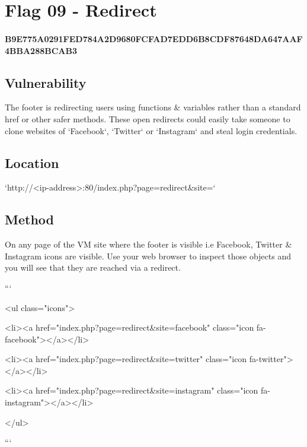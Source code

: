 \section{Flag 09 - Redirect}

\paragraph{B9E775A0291FED784A2D9680FCFAD7EDD6B8CDF87648DA647AAF4BBA288BCAB3}

\subsection{Vulnerability}

The footer is redirecting users using functions \& variables rather than a standard href or other safer methods. These open redirects could easily take someone to clone websites of `Facebook`, `Twitter` or `Instagram` and steal login credentials.

\subsection{Location}

`http://<ip-address>:80/index.php?page=redirect\&site=`

\subsection{Method}

On any page of the VM site where the footer is visible i.e Facebook, Twitter \& Instagram icons are visible. Use your web browser to inspect those objects and you will see that they are reached via a redirect.

```

<ul class="icons">

    <li><a href="index.php?page=redirect\&site=facebook" class="icon fa-facebook"></a></li>

    <li><a href="index.php?page=redirect\&site=twitter" class="icon fa-twitter"></a></li>
    
    <li><a href="index.php?page=redirect\&site=instagram" class="icon fa-instagram"></a></li>

</ul>

```

